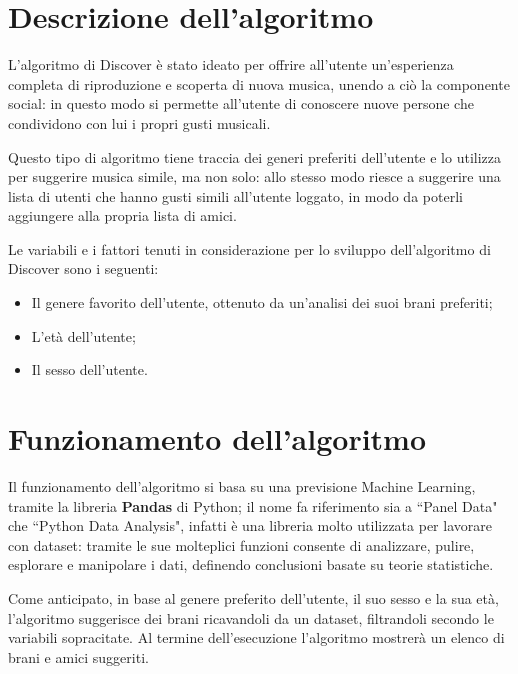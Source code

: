 \newpage
\section{Descrizione dell'algoritmo}
L'algoritmo di Discover è stato ideato per offrire all'utente un'esperienza completa di riproduzione e scoperta di nuova musica, unendo a ciò la 
componente social: in questo modo si permette all'utente di conoscere nuove persone che condividono con lui i propri gusti musicali. 

Questo tipo di algoritmo 
tiene traccia dei generi preferiti dell'utente e lo utilizza per suggerire musica simile, ma non solo: allo stesso modo riesce a suggerire 
una lista di utenti che hanno gusti simili all'utente loggato, in modo da poterli aggiungere alla propria lista di amici.  

Le variabili e i fattori tenuti in considerazione per lo sviluppo dell'algoritmo di Discover sono i seguenti: 
\begin{itemize}
    \item Il genere favorito dell'utente, ottenuto da un'analisi dei suoi brani preferiti;
    \item L'età dell'utente;
    \item Il sesso dell'utente.
\end{itemize}

\vspace{1cm}
\section{Funzionamento dell'algoritmo}
Il funzionamento dell'algoritmo si basa su una previsione Machine Learning, tramite la libreria \textbf{Pandas} di Python;
il nome fa riferimento sia a ``Panel Data" che ``Python Data Analysis", infatti è una libreria molto utilizzata per lavorare 
con dataset: tramite le sue molteplici funzioni consente di analizzare, pulire, esplorare e manipolare i dati, definendo 
conclusioni basate su teorie statistiche. 

Come anticipato, in base al genere preferito dell'utente, il suo sesso e la sua età, l'algoritmo suggerisce dei brani ricavandoli 
da un dataset, filtrandoli secondo le variabili sopracitate. Al termine dell'esecuzione l'algoritmo mostrerà un elenco di brani e amici suggeriti.

